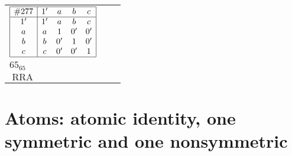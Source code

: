 \documentclass[12pt]{article}
\theoremstyle{definition}
\newcommand\RRA{\operatorname{RRA}}
\newcommand{\id}{{1'}}%
\renewcommand{\div}{0'}
\renewcommand{\top}{1}%
\begin{document}
\begin{center}
\begin{longtable}{l|c|c}
$
\begin{array}{|c|cccc|} \hline
\#277 & \id & a & b & c \\ \hline
\id & \id & a & b & c \\
a & a & \top & \div & \div \\
b & b & \div & \top & \div \\
c & c & \div & \div & \top \\ \hline
\end{array}
$
 & \begin{tabular}{c} yes \\ $65_{65}$ \\ $\RRA$ \end{tabular} 
 & \adjustbox{valign=c, max height=1.6cm}{$
\left[ \begin{array}{cccccc}
\id & a & a & b & c & c \\ 
a & \id & a & a & a & c \\ 
a & a & \id & b & b & c \\ 
b & a & b & \id & b & c \\ 
c & a & b & b & \id & c \\ 
c & c & c & c & c & \id
\end{array}\right]
$}      \\[15mm]

\end{longtable}
\end{center}

\section[Atomic identity, one symmetric, one nonsymmetric]{Atoms: atomic identity, one symmetric and one nonsymmetric}
\end{document}
